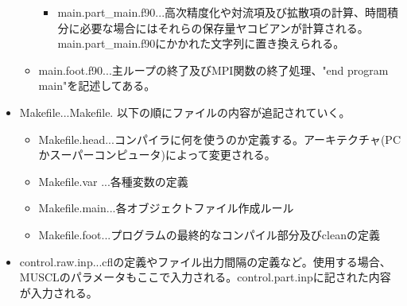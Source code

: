 \documentclass{jsarticle}
\begin{document}
\begin{itemize}
\begin{itemize}
\begin{itemize}
\item main.part\_main.f90...高次精度化や対流項及び拡散項の計算、時間積分に必要な場合にはそれらの保存量ヤコビアンが計算される。main.part\_main.f90にかかれた文字列に置き換えられる。
\end{itemize}
\item main.foot.f90...主ループの終了及びMPI関数の終了処理、"end program main"を記述してある。
\end{itemize}
\item Makefile...Makefile. 以下の順にファイルの内容が追記されていく。
\begin{itemize}
\item Makefile.head...コンパイラに何を使うのか定義する。アーキテクチャ(PCかスーパーコンピュータ)によって変更される。
\item Makefile.var ...各種変数の定義
\item Makefile.main...各オブジェクトファイル作成ルール
\item Makefile.foot...プログラムの最終的なコンパイル部分及びcleanの定義
\end{itemize}
\item control.raw.inp...cflの定義やファイル出力間隔の定義など。使用する場合、MUSCLのパラメータもここで入力される。control.part.inpに記された内容が入力される。
\end{itemize}
\end{document}
